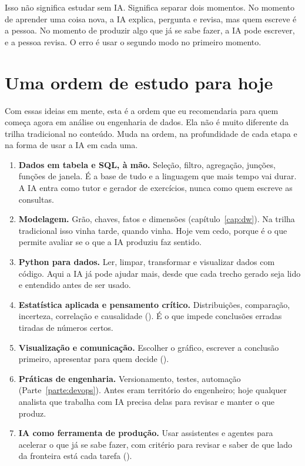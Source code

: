 Isso não significa estudar sem IA. Significa separar dois momentos. No momento de
aprender uma coisa nova, a IA explica, pergunta e revisa, mas quem escreve é a pessoa. No
momento de produzir algo que já se sabe fazer, a IA pode escrever, e a pessoa revisa. O
erro é usar o segundo modo no primeiro momento.

\section{Uma ordem de estudo para hoje}
\label{sec:ordem-estudo}

Com essas ideias em mente, esta é a ordem que eu recomendaria para quem começa agora em
análise ou engenharia de dados. Ela não é muito diferente da trilha tradicional no
conteúdo. Muda na ordem, na profundidade de cada etapa e na forma de usar a IA em cada uma.

\begin{enumerate}
  \item \textbf{Dados em tabela e SQL, à mão.} Seleção, filtro, agregação, junções, funções
    de janela. É a base de tudo e a linguagem que mais tempo vai durar. A IA entra como
    tutor e gerador de exercícios, nunca como quem escreve as consultas.
  \item \textbf{Modelagem.} Grão, chaves, fatos e dimensões (capítulo~\ref{cap:dw}). Na
    trilha tradicional isso vinha tarde, quando vinha. Hoje vem cedo, porque é o que
    permite avaliar se o que a IA produziu faz sentido.
  \item \textbf{Python para dados.} Ler, limpar, transformar e visualizar dados com
    código. Aqui a IA já pode ajudar mais, desde que cada trecho gerado seja lido e
    entendido antes de ser usado.
  \item \textbf{Estatística aplicada e pensamento crítico.} Distribuições, comparação,
    incerteza, correlação e causalidade (). É o que impede
    conclusões erradas tiradas de números certos.
  \item \textbf{Visualização e comunicação.} Escolher o gráfico, escrever a conclusão
    primeiro, apresentar para quem decide ().
  \item \textbf{Práticas de engenharia.} Versionamento, testes, automação
    (Parte~\ref{parte:devops}). Antes eram território do engenheiro; hoje qualquer
    analista que trabalha com IA precisa delas para revisar e manter o que produz.
  \item \textbf{IA como ferramenta de produção.} Usar assistentes e agentes para
    acelerar o que já se sabe fazer, com critério para revisar e saber de que lado da
    fronteira está cada tarefa ().
\end{enumerate}

